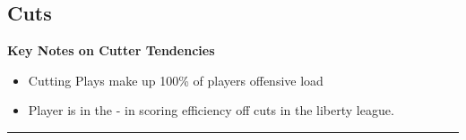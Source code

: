 \documentclass[a4paper,12pt]{article}
\begin{document}
\clearpage



\subsection{Cuts}
\vspace{0.25em} %
\textbf{Key Notes on Cutter Tendencies}
\vspace{0.5em} %

\begin{itemize}
    \item Cutting Plays make up 100\% of players offensive load
    \vspace{0.3em} %
    \item Player is in the - in scoring efficiency off cuts in the liberty league.
\end{itemize}

\vspace{1em} %
\hrule height 1pt width 1\textwidth %
\vspace{0em} %
\end{document}
